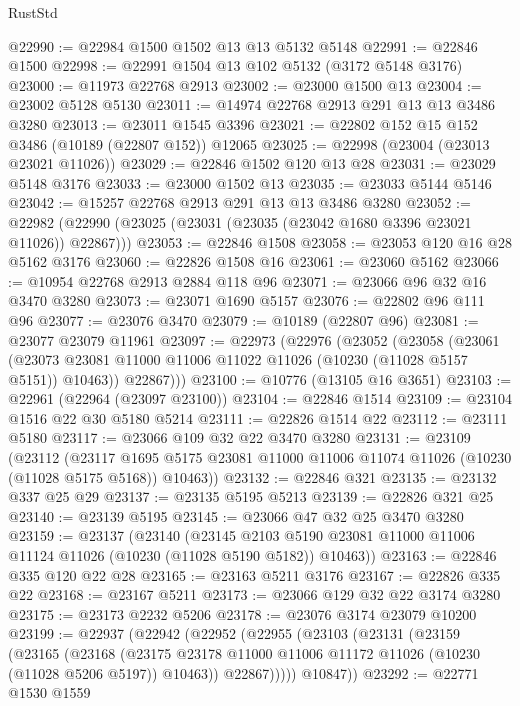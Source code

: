 \begin{lexlean}{RustStd}
\begin{coremodule}
@22990 := @22984 @1500 @1502 @13 @13 @5132 @5148
@22991 := @22846 @1500
@22998 := @22991 @1504 @13 @102 @5132 (@3172 @5148 @3176)
@23000 := @11973 @22768 @2913
@23002 := @23000 @1500 @13
@23004 := @23002 @5128 @5130
@23011 := @14974 @22768 @2913 @291 @13 @13 @3486 @3280
@23013 := @23011 @1545 @3396
@23021 := @22802 @152 @15 @152 @3486 (@10189 (@22807 @152)) @12065
@23025 := @22998 (@23004 (@23013 @23021 @11026))
@23029 := @22846 @1502 @120 @13 @28
@23031 := @23029 @5148 @3176
@23033 := @23000 @1502 @13
@23035 := @23033 @5144 @5146
@23042 := @15257 @22768 @2913 @291 @13 @13 @3486 @3280
@23052 := @22982 (@22990 (@23025 (@23031 (@23035 (@23042 @1680 @3396 @23021 @11026)) @22867)))
@23053 := @22846 @1508
@23058 := @23053 @120 @16 @28 @5162 @3176
@23060 := @22826 @1508 @16
@23061 := @23060 @5162
@23066 := @10954 @22768 @2913 @2884 @118 @96
@23071 := @23066 @96 @32 @16 @3470 @3280
@23073 := @23071 @1690 @5157
@23076 := @22802 @96 @111 @96
@23077 := @23076 @3470
@23079 := @10189 (@22807 @96)
@23081 := @23077 @23079 @11961
@23097 := @22973
    (@22976
      (@23052
        (@23058
          (@23061 (@23073 @23081 @11000 @11006 @11022 @11026 (@10230 (@11028 @5157 @5151)) @10463))
          @22867)))
@23100 := @10776 (@13105 @16 @3651)
@23103 := @22961 (@22964 (@23097 @23100))
@23104 := @22846 @1514
@23109 := @23104 @1516 @22 @30 @5180 @5214
@23111 := @22826 @1514 @22
@23112 := @23111 @5180
@23117 := @23066 @109 @32 @22 @3470 @3280
@23131 := @23109
    (@23112
      (@23117 @1695 @5175 @23081 @11000 @11006 @11074 @11026 (@10230 (@11028 @5175 @5168)) @10463))
@23132 := @22846 @321
@23135 := @23132 @337 @25 @29
@23137 := @23135 @5195 @5213
@23139 := @22826 @321 @25
@23140 := @23139 @5195
@23145 := @23066 @47 @32 @25 @3470 @3280
@23159 := @23137
    (@23140
      (@23145 @2103 @5190 @23081 @11000 @11006 @11124 @11026 (@10230 (@11028 @5190 @5182)) @10463))
@23163 := @22846 @335 @120 @22 @28
@23165 := @23163 @5211 @3176
@23167 := @22826 @335 @22
@23168 := @23167 @5211
@23173 := @23066 @129 @32 @22 @3174 @3280
@23175 := @23173 @2232 @5206
@23178 := @23076 @3174 @23079 @10200
@23199 := @22937
    (@22942
      (@22952
        (@22955
          (@23103
            (@23131
              (@23159
                (@23165
                  (@23168
                    (@23175
                      @23178
                      @11000
                      @11006
                      @11172
                      @11026
                      (@10230 (@11028 @5206 @5197))
                      @10463))
                  @22867)))))
        @10847))
@23292 := @22771
    @1530
    @1559

\end{coremodule}
\end{lexlean}
